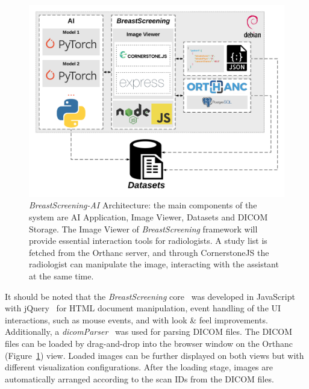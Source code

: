 \begin{figure}[htbp]
\centering
\includegraphics[width=0.80\linewidth]{images/fig041}
\caption{{\it BreastScreening-AI} Architecture: the main components of the system are AI Application, Image Viewer, Datasets and DICOM Storage. The Image Viewer of {\it BreastScreening} framework will provide essential interaction tools for radiologists. A study list is fetched from the Orthanc server, and through CornerstoneJS the radiologist can manipulate the image, interacting with the assistant at the same time.}
\label{fig:fig041}
\end{figure}

It should be noted that the {\it BreastScreening} core~\cite{10.1145/3399715.3399744} was developed in JavaScript with jQuery\footnotemark[21]~\cite{CALISTO2022102285} for \ac{HTML} document manipulation, event handling of the \ac{UI} interactions, such as mouse events, and with look \& feel improvements.
Additionally, a {\it dicomParser}~\cite{CALISTO2021102607} was used for parsing \ac{DICOM} files.
The \ac{DICOM} files can be loaded by drag-and-drop into the browser window on the Orthanc  (Figure~\ref{fig:fig041}) view.
Loaded images can be further displayed on both views but with different visualization configurations.
After the loading stage, images are automatically arranged according to the scan IDs from the \ac{DICOM} files.



